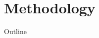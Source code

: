 \documentclass[12pt,dvipsnames]{beamer}
\newcommand{\cast}{\Rightarrow}
\newcommand{\IntT}{\ensuremath{\mathsf{Int}}}
\newcommand{\DynT}{\ensuremath{\mathsf{\star}}}
\newcommand{\RefT}[1]{\ensuremath{\mathsf{Ref}\ #1}}
\newcommand{\FunT}[2]{\ensuremath{#1 \to #2}}
\newcommand{\PairT}[2]{\ensuremath{#1 \times #2}}
\newcommand{\coercion}[1]{\ensuremath{\langle #1 \rangle}}
\newcommand{\coerce}[2]{\ensuremath{#1 \coercion{#2}}}
\newcommand{\coerced}[2]{\ensuremath{\coerce{#1}{#2}}}
\begin{document}

\section{Methodology}

\begin{frame}{Outline}
  \tableofcontents[currentsection]
\end{frame}
\end{document}
